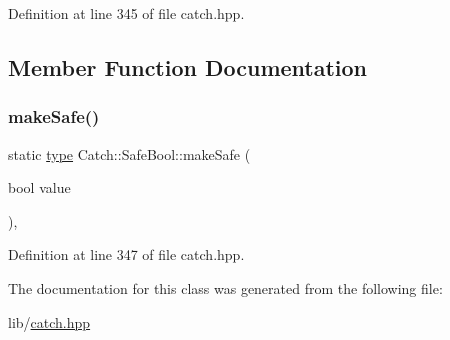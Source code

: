 Definition at line 345 of file catch.\+hpp.



\subsection{Member Function Documentation}
\hypertarget{class_catch_1_1_safe_bool_af0ea63d9820f8bf7a8b76377913c4e77}{}\label{class_catch_1_1_safe_bool_af0ea63d9820f8bf7a8b76377913c4e77} 
\subsubsection{\texorpdfstring{make\+Safe()}{makeSafe()}}
{\footnotesize\ttfamily static \hyperlink{class_catch_1_1_safe_bool_a39eef9baed296299d625a54d54a2a958}{type} Catch\+::\+Safe\+Bool\+::make\+Safe (\begin{DoxyParamCaption}\item[{bool}]{value }\end{DoxyParamCaption})\hspace{0.3cm}{\ttfamily [inline]}, {\ttfamily [static]}}



Definition at line 347 of file catch.\+hpp.



The documentation for this class was generated from the following file\+:\begin{DoxyCompactItemize}
\item 
lib/\hyperlink{catch_8hpp}{catch.\+hpp}\end{DoxyCompactItemize}

